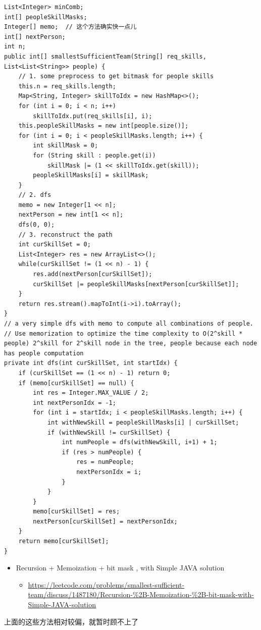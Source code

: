 \documentclass[9pt, b5paaper]{book}
\begin{document}
\begin{verbatim}
List<Integer> minComb;
int[] peopleSkillMasks;
Integer[] memo;  // 这个方法确实快一点儿
int[] nextPerson;
int n;
public int[] smallestSufficientTeam(String[] req_skills, List<List<String>> people) {
    // 1. some preprocess to get bitmask for people skills
    this.n = req_skills.length;
    Map<String, Integer> skillToIdx = new HashMap<>();
    for (int i = 0; i < n; i++) 
        skillToIdx.put(req_skills[i], i);
    this.peopleSkillMasks = new int[people.size()];
    for (int i = 0; i < peopleSkillMasks.length; i++) {
        int skillMask = 0;
        for (String skill : people.get(i)) 
            skillMask |= (1 << skillToIdx.get(skill));
        peopleSkillMasks[i] = skillMask;
    }
    // 2. dfs
    memo = new Integer[1 << n];
    nextPerson = new int[1 << n];
    dfs(0, 0);
    // 3. reconstruct the path
    int curSkillSet = 0;
    List<Integer> res = new ArrayList<>();
    while(curSkillSet != (1 << n) - 1) {
        res.add(nextPerson[curSkillSet]);
        curSkillSet |= peopleSkillMasks[nextPerson[curSkillSet]];
    }
    return res.stream().mapToInt(i->i).toArray();
}
// a very simple dfs with memo to compute all combinations of people. 
// Use memorization to optimize the time complexity to O(2^skill * people) 2^skill for 2^skill node in the tree, people because each node has people computation
private int dfs(int curSkillSet, int startIdx) {
    if (curSkillSet == (1 << n) - 1) return 0;
    if (memo[curSkillSet] == null) {
        int res = Integer.MAX_VALUE / 2;
        int nextPersonIdx = -1;
        for (int i = startIdx; i < peopleSkillMasks.length; i++) {
            int withNewSkill = peopleSkillMasks[i] | curSkillSet; 
            if (withNewSkill != curSkillSet) {
                int numPeople = dfs(withNewSkill, i+1) + 1;
                if (res > numPeople) {
                    res = numPeople;
                    nextPersonIdx = i;
                }
            }
        }
        memo[curSkillSet] = res;
        nextPerson[curSkillSet] = nextPersonIdx; 
    }
    return memo[curSkillSet];
}
\end{verbatim}
\begin{itemize}
\item Recursion + Memoization + bit mask , with Simple JAVA solution
\begin{itemize}
\item \url{https://leetcode.com/problems/smallest-sufficient-team/discuss/1487180/Recursion-\%2B-Memoization-\%2B-bit-mask-with-Simple-JAVA-solution}
\end{itemize}
\end{itemize}
上面的这些方法相对较偏，就暂时顾不上了
\end{document}
